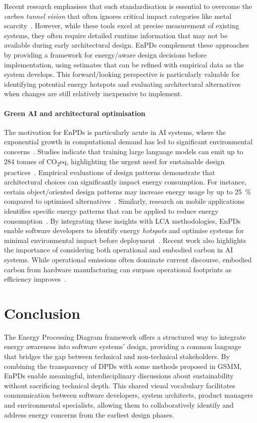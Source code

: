 \documentclass[11pt,a4paper]{article}
\begin{document}
Recent research emphasises that such standardisation is essential to overcome the \emph{carbon tunnel vision} that often ignores critical impact categories like metal scarcity~\cite{ligozat2022unraveling}.
However, while these tools excel at precise measurement of existing systems, they often require detailed runtime information that may not be available during early architectural design.
EnPDs complement these approaches by providing a framework for energy\-/aware design decisions before implementation, using estimates that can be refined with empirical data as the system develops.
This forward\-/looking perspective is particularly valuable for identifying potential energy hotspots and evaluating architectural alternatives when changes are still relatively inexpensive to implement.

\paragraph{Green AI and architectural optimisation}
The motivation for EnPDs is particularly acute in AI systems, where the exponential growth in computational demand has led to significant environmental concerns~\cite{schwartz2020green}.
Studies indicate that training large language models can emit up to \num{284} tonnes of CO\textsubscript{2}eq, highlighting the urgent need for sustainable design practices~\cite{strubell2019energy}.
Empirical evaluations of design patterns demonstrate that architectural choices can significantly impact energy consumption.
For instance, certain object\-/oriented design patterns may increase energy usage by up to \qty{25}{\percent} compared to optimised alternatives~\cite{feitosa2017investigating}.
Similarly, research on mobile applications identifies specific energy patterns that can be applied to reduce energy consumption~\cite{cruz2019catalog}.
By integrating these insights with LCA methodologies, EnPDs enable software developers to identify energy \emph{hotspots} and optimise systems for minimal environmental impact before deployment~\cite{ligozat2022unraveling}.
Recent work also highlights the importance of considering both operational and embodied carbon in AI systems.
While operational emissions often dominate current discourse, embodied carbon from hardware manufacturing can surpass operational footprints as efficiency improves~\cite{wu2022sustainable}.

\section{Conclusion}
The Energy Processing Diagram framework offers a structured way to integrate energy awareness into software systems' design, providing a common language that bridges the gap between technical and non-technical stakeholders.
By combining the transparency of DPDs with some methods proposed in GSMM, EnPDs enable meaningful, interdisciplinary discussions about sustainability without sacrificing technical depth.
This shared visual vocabulary facilitates communication between software developers, system architects, product managers and environmental specialists, allowing them to collaboratively identify and address energy concerns from the earliest design phases.
\end{document}
